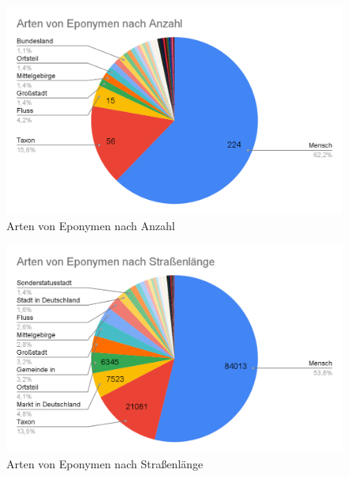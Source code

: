 \documentclass[ngerman,twocolumn,showpacs,%
  nofootinbib,aps,superscriptaddress,%
  eqsecnum,prd,notitlepage,showkeys,10pt,report]{revtex4-2}
\begin{document}
\begin{figure}
  \centering
  \includegraphics[width=1\linewidth]{1.png}
  \caption{Arten von Eponymen nach Anzahl}
  \label{fig:TypesByCount}
\end{figure}
\begin{figure}
  \centering
  \includegraphics[width=1\linewidth]{2.png}
  \caption{Arten von Eponymen nach Straßenlänge}
  \label{fig:TypesByLength}
\end{figure}
\end{document}
